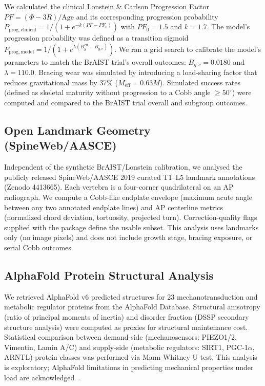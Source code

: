 We calculated the clinical Lonstein \& Carlson Progression Factor $PF = (\Phi - 3R)/\mathrm{Age}$ and its corresponding progression probability $P_{\mathrm{prog, clinical}} = 1 / (1 + e^{-k(PF - PF_0)})$ with $PF_0 = 1.5$ and $k=1.7$. The model's progression probability was defined as a transition sigmoid $P_{\mathrm{prog, model}} = 1 / (1 + e^{\lambda (B_g^{\mathrm{eff}} - B_{g,c})})$. We ran a grid search to calibrate the model's parameters to match the BrAIST trial's overall outcomes: $B_{g,c} = 0.0180$ and $\lambda = 110.0$. Bracing wear was simulated by introducing a load-sharing factor that reduces gravitational mass by 37\% ($M_{\mathrm{eff}} = 0.63 M$). Simulated success rates (defined as skeletal maturity without progression to a Cobb angle $\ge 50^\circ$) were computed and compared to the BrAIST trial overall and subgroup outcomes.

\subsection{Open Landmark Geometry (SpineWeb/AASCE)}

Independent of the synthetic BrAIST/Lonstein calibration, we analysed the publicly released SpineWeb/AASCE 2019 curated T1--L5 landmark annotations~\cite{wu2020spineweb} (Zenodo 4413665). Each vertebra is a four-corner quadrilateral on an AP radiograph. We compute a Cobb-like endplate envelope (maximum acute angle between any two annotated endplate lines) and AP centerline metrics (normalized chord deviation, tortuosity, projected turn). Correction-quality flags supplied with the package define the usable subset. This analysis uses landmarks only (no image pixels) and does not include growth stage, bracing exposure, or serial Cobb outcomes.

\subsection{AlphaFold Protein Structural Analysis}

We retrieved AlphaFold v6 predicted structures for 23 mechanotransduction and metabolic regulator proteins from the AlphaFold Database. Structural anisotropy (ratio of principal moments of inertia) and disorder fraction (DSSP secondary structure analysis) were computed as proxies for structural maintenance cost. Statistical comparison between demand-side (mechanosensors: PIEZO1/2, Vimentin, Lamin A/C) and supply-side (metabolic regulators: SIRT1, PGC-1$\alpha$, ARNTL) protein classes was performed via Mann-Whitney U test. This analysis is exploratory; AlphaFold limitations in predicting mechanical properties under load are acknowledged~\cite{gomes2022protein}.


